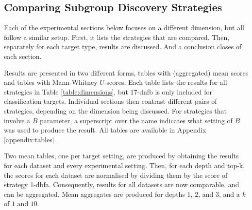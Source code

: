 \documentclass[smallextended]{svjour3}
\newcommand{\dbfa}[1]{1-dbfa}
\newcommand{\dnfb}[1]{17-dnfb} %
\begin{document}
\subsection{Comparing Subgroup Discovery Strategies}
\label{section:comparing-subgroup-discovery-strategies}

Each of the experimental sections below focuses on a different dimension, but all follow a similar setup.
First, it lists the strategies that are compared.
Then, separately for each target type, results are discussed.
And a conclusion closes of each section.

Results are presented in two different forms, tables with (aggregated) mean scores and tables with Mann-Whitney $U$-scores.
Each table lists the results for all strategies in Table \ref{table:dimensions}, but \dnfb{0} is only included for classification targets.
Individual sections then contrast different pairs of strategies, depending on the dimension being discussed.
For strategies that involve a $B$ parameter, a superscript over the name indicates what setting of $B$ was used to produce the result.
All tables are available in Appendix \ref{appendix:tables}.

Two mean tables, one per target setting, are produced by obtaining the results for each dataset and every experimental setting.
Then, for each depth and top-k, the scores for each dataset are normalised by dividing them by the score of strategy \dbfa{0}.
Consequently, results for all datasets are now comparable, and can be aggregated.
Mean aggregates are produced for depths $1$, $2$, and $3$, and a \emph{k} of $1$ and $10$.
\end{document}

